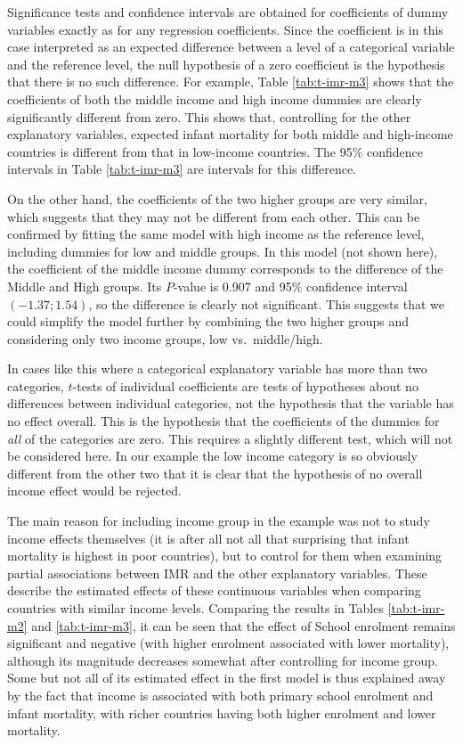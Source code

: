 \documentclass[11pt,a4paper,openany]{book}
\begin{document}
Significance tests and confidence intervals are obtained for
coefficients of dummy variables exactly as for any regression
coefficients. Since the coefficient is in this case interpreted as an
expected difference between a level of a categorical variable and the
reference level, the null hypothesis of a zero coefficient is the
hypothesis that there is no such difference. For example, Table
\ref{tab:t-imr-m3} shows that the coefficients of both the middle income
and high income dummies are clearly significantly different from zero.
This shows that, controlling for the other explanatory variables,
expected infant mortality for both middle and high-income countries is
different from that in low-income countries. The 95\% confidence
intervals in Table \ref{tab:t-imr-m3} are intervals for this difference.

On the other hand, the coefficients of the two higher groups are very
similar, which suggests that they may not be different from each other.
This can be confirmed by fitting the same model with high income as the
reference level, including dummies for low and middle groups. In this
model (not shown here), the coefficient of the middle income dummy
corresponds to the difference of the Middle and High groups. Its
\(P\)-value is 0.907 and 95\% confidence interval \((-1.37; 1.54)\), so
the difference is clearly not significant. This suggests that we could
simplify the model further by combining the two higher groups and
considering only two income groups, low vs.~middle/high.

In cases like this where a categorical explanatory variable has more
than two categories, \(t\)-tests of individual coefficients are tests of
hypotheses about no differences between individual categories, not the
hypothesis that the variable has no effect overall. This is the
hypothesis that the coefficients of the dummies for \emph{all} of the
categories are zero. This requires a slightly different test, which will
not be considered here. In our example the low income category is so
obviously different from the other two that it is clear that the
hypothesis of no overall income effect would be rejected.

The main reason for including income group in the example was not to
study income effects themselves (it is after all not all that surprising
that infant mortality is highest in poor countries), but to control for
them when examining partial associations between IMR and the other
explanatory variables. These describe the estimated effects of these
continuous variables when comparing countries with similar income
levels. Comparing the results in Tables \ref{tab:t-imr-m2} and
\ref{tab:t-imr-m3}, it can be seen that the effect of School enrolment
remains significant and negative (with higher enrolment associated with
lower mortality), although its magnitude decreases somewhat after
controlling for income group. Some but not all of its estimated effect
in the first model is thus explained away by the fact that income is
associated with both primary school enrolment and infant mortality, with
richer countries having both higher enrolment and lower mortality.
\end{document}
